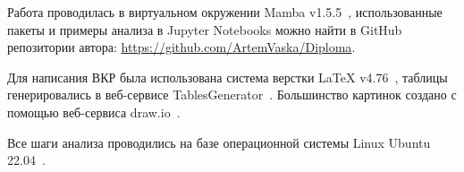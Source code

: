 Работа проводилась в виртуальном окружении Mamba v1.5.5~\cite{mamba}, использованные пакеты и примеры анализа в Jupyter Notebooks можно найти в GitHub~\cite{github_general} репозитории автора: \url{https://github.com/ArtemVaska/Diploma}.

Для написания ВКР была использована система верстки LaTeX v4.76~\cite{latex}, таблицы генерировались в веб-сервисе TablesGenerator~\cite{tablesgenerator}.
Большинство картинок создано с помощью веб-сервиса draw.io~\cite{drawio}.

Все шаги анализа проводились на базе операционной системы Linux Ubuntu 22.04~\cite{ubuntu}.
